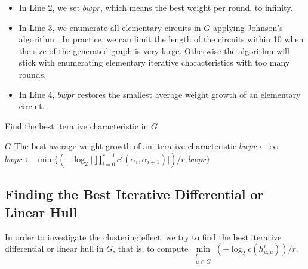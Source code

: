 \begin{itemize}
    \item In Line 2, we set $bwpr$, which means the best weight per round, to infinity. 
    \item In Line 3, we enumerate all elementary circuits in $G$ applying Johnson's algorithm \cite{johnson1975finding}. In practice, we can limit the length of the circuits within 10 when the size of the generated graph is very large. Otherwise the algorithm will stick with enumerating elementary iterative characteristics with too many rounds. 
    \item In Line 4, $bwpr$ restores the smallest average weight growth of an elementary circuit. 
\end{itemize}

\begin{algorithm}
	\caption{Find the best iterative characteristic in $G$}
	\label{algo:find-ite-c}
	\begin{algorithmic}[1]
        \Require $G$
        \Ensure The best average weight growth of an iterative characteristic
        \Procedure {}{}
        \State $bwpr\leftarrow\infty$
        \State $bwpr\leftarrow\min\{(-\log_2\Big|\prod\limits_{i=0}^{r-1}c'(\alpha_i,\alpha_{i+1})\Big|)/r,bwpr\}$        
        \EndFor
        \State {}
		\EndProcedure
	\end{algorithmic}
\end{algorithm}

\subsection{Finding the Best Iterative Differential or Linear Hull}\label{sec:find_ite_h}

In order to investigate the clustering effect, we try to find the best iterative differential or linear hull in $G$, that is, to compute $\min\limits_{\substack{r\\u\in G}}(-\log_2c(h^r_{u,u}))/r$. 


